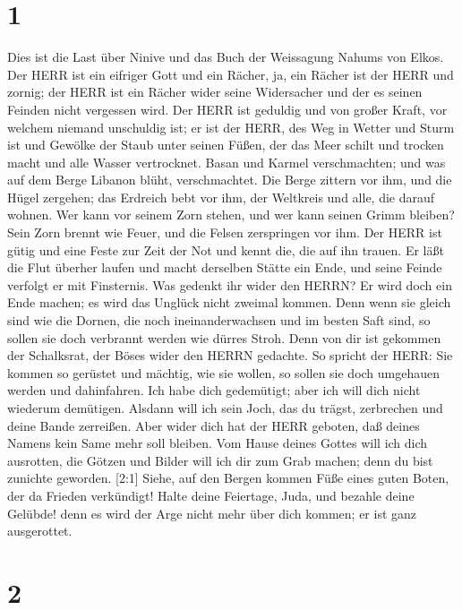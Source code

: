 \hypertarget{section}{%
\section{1}\label{section}}

 Dies ist die Last über Ninive und das Buch der Weissagung
Nahums von Elkos.  Der HERR ist ein eifriger Gott und ein
Rächer, ja, ein Rächer ist der HERR und zornig; der HERR ist ein Rächer
wider seine Widersacher und der es seinen Feinden nicht vergessen wird.
 Der HERR ist geduldig und von großer Kraft, vor welchem
niemand unschuldig ist; er ist der HERR, des Weg in Wetter und Sturm ist
und Gewölke der Staub unter seinen Füßen,  der das Meer
schilt und trocken macht und alle Wasser vertrocknet. Basan und Karmel
verschmachten; und was auf dem Berge Libanon blüht, verschmachtet.
 Die Berge zittern vor ihm, und die Hügel zergehen; das
Erdreich bebt vor ihm, der Weltkreis und alle, die darauf wohnen.
 Wer kann vor seinem Zorn stehen, und wer kann seinen Grimm
bleiben? Sein Zorn brennt wie Feuer, und die Felsen zerspringen vor ihm.
 Der HERR ist gütig und eine Feste zur Zeit der Not und
kennt die, die auf ihn trauen.  Er läßt die Flut überher
laufen und macht derselben Stätte ein Ende, und seine Feinde verfolgt er
mit Finsternis.  Was gedenkt ihr wider den HERRN? Er wird
doch ein Ende machen; es wird das Unglück nicht zweimal kommen.
 Denn wenn sie gleich sind wie die Dornen, die noch
ineinanderwachsen und im besten Saft sind, so sollen sie doch verbrannt
werden wie dürres Stroh.  Denn von dir ist gekommen der
Schalksrat, der Böses wider den HERRN gedachte.  So spricht
der HERR: Sie kommen so gerüstet und mächtig, wie sie wollen, so sollen
sie doch umgehauen werden und dahinfahren. Ich habe dich gedemütigt;
aber ich will dich nicht wiederum demütigen.  Alsdann will
ich sein Joch, das du trägst, zerbrechen und deine Bande zerreißen.
 Aber wider dich hat der HERR geboten, daß deines Namens
kein Same mehr soll bleiben. Vom Hause deines Gottes will ich dich
ausrotten, die Götzen und Bilder will ich dir zum Grab machen; denn du
bist zunichte geworden.  {[}2:1{]} Siehe, auf den Bergen
kommen Füße eines guten Boten, der da Frieden verkündigt! Halte deine
Feiertage, Juda, und bezahle deine Gelübde! denn es wird der Arge nicht
mehr über dich kommen; er ist ganz ausgerottet.

\hypertarget{section-1}{%
\section{2}\label{section-1}}

